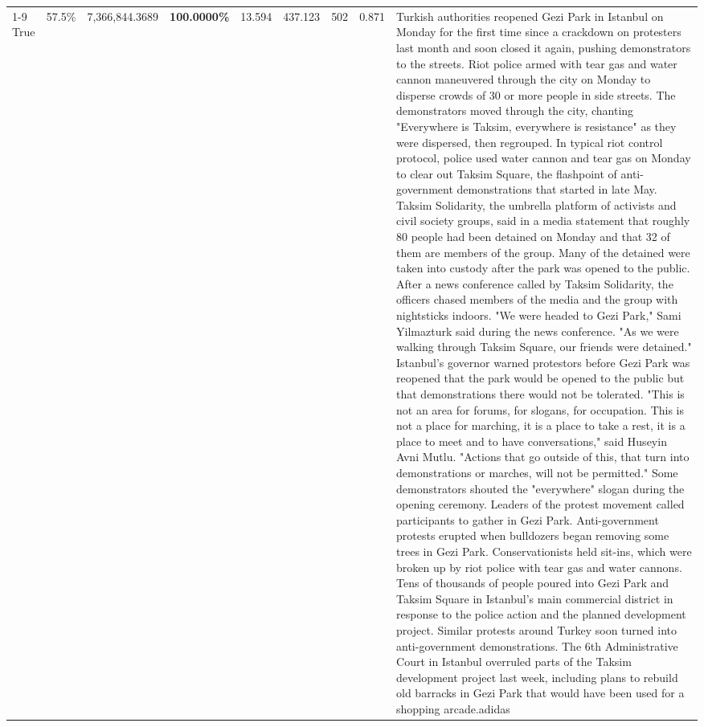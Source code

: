 \begin{table}[H]
\begin{tabular}{lllrlllll}
\cline{1-9}
True & 57.5\% & 7,366,844.3689 & \bfseries \color{red} 100.0000\% & 13.594 & 437.123 & 502 & 0.871 & Turkish authorities reopened Gezi Park in Istanbul on Monday for the first time since a crackdown on protesters last month and soon closed it again, pushing demonstrators to the streets. Riot police armed with tear gas and water cannon maneuvered through the city on Monday to disperse crowds of 30 or more people in side streets. The demonstrators moved through the city, chanting "Everywhere is Taksim, everywhere is resistance" as they were dispersed, then regrouped. In typical riot control protocol, police used water cannon and tear gas on Monday to clear out Taksim Square, the flashpoint of anti-government demonstrations that started in late May. Taksim Solidarity, the umbrella platform of activists and civil society groups, said in a media statement that roughly 80 people had been detained on Monday and that 32 of them are members of the group. Many of the detained were taken into custody after the park was opened to the public. After a news conference called by Taksim Solidarity, the officers chased members of the media and the group with nightsticks indoors. "We were headed to Gezi Park," Sami Yilmazturk said during the news conference. "As we were walking through Taksim Square, our friends were detained." Istanbul's governor warned protestors before Gezi Park was reopened that the park would be opened to the public but that demonstrations there would not be tolerated. "This is not an area for forums, for slogans, for occupation. This is not a place for marching, it is a place to take a rest, it is a place to meet and to have conversations," said Huseyin Avni Mutlu. "Actions that go outside of this, that turn into demonstrations or marches, will not be permitted." Some demonstrators shouted the "everywhere" slogan during the opening ceremony. Leaders of the protest movement called participants to gather in Gezi Park. Anti-government protests erupted when bulldozers began removing some trees in Gezi Park. Conservationists held sit-ins, which were broken up by riot police with tear gas and water cannons. Tens of thousands of people poured into Gezi Park and Taksim Square in Istanbul's main commercial district in response to the police action and the planned development project. Similar protests around Turkey soon turned into anti-government demonstrations. The 6th Administrative Court in Istanbul overruled parts of the Taksim development project last week, including plans to rebuild old barracks in Gezi Park that would have been used for a shopping arcade.adidas \\

\end{tabular}
\end{table}
